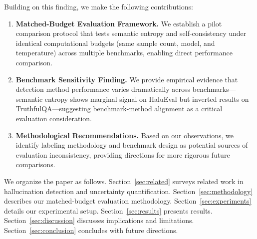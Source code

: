 Building on this finding, we make the following contributions:

\begin{enumerate}
    \item \textbf{Matched-Budget Evaluation Framework.} We establish a pilot comparison protocol that tests semantic entropy and self-consistency under identical computational budgets (same sample count, model, and temperature) across multiple benchmarks, enabling direct performance comparison.

    \item \textbf{Benchmark Sensitivity Finding.} We provide empirical evidence that detection method performance varies dramatically across benchmarks---semantic entropy shows marginal signal on HaluEval but inverted results on TruthfulQA---suggesting benchmark-method alignment as a critical evaluation consideration.

    \item \textbf{Methodological Recommendations.} Based on our observations, we identify labeling methodology and benchmark design as potential sources of evaluation inconsistency, providing directions for more rigorous future comparisons.
\end{enumerate}

We organize the paper as follows. Section~\ref{sec:related} surveys related work in hallucination detection and uncertainty quantification. Section~\ref{sec:methodology} describes our matched-budget evaluation methodology. Section~\ref{sec:experiments} details our experimental setup. Section~\ref{sec:results} presents results. Section~\ref{sec:discussion} discusses implications and limitations. Section~\ref{sec:conclusion} concludes with future directions.
